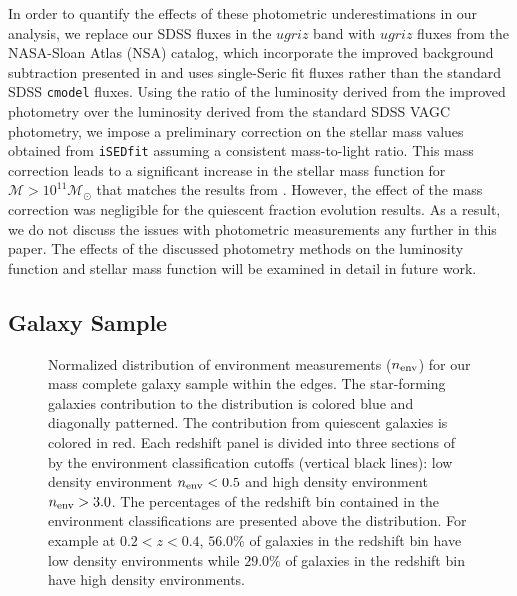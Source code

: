 \documentclass{emulateapj}
\begin{document}
In order to quantify the effects of these photometric underestimations in our analysis, we replace our SDSS fluxes in the $ugriz$ band with $ugriz$ fluxes from the NASA-Sloan Atlas (NSA) catalog, which incorporate the improved background subtraction presented in \cite{Blanton:2011aa} and uses single-Seric fit fluxes rather than the standard SDSS \texttt{cmodel} fluxes. Using the ratio of the luminosity derived from the improved photometry over the luminosity derived from the standard SDSS VAGC photometry, we impose a preliminary correction on the stellar mass values obtained from \texttt{iSEDfit} assuming a consistent mass-to-light ratio. This mass correction leads to a significant increase in the stellar mass function for $\mathcal{M} > 10^{11} \mathcal{M}_{\odot}$ that matches the results from \cite{Bernardi:2013aa}. However, the effect of the mass correction was negligible for the quiescent fraction evolution results. As a result, we do not discuss the issues with photometric measurements any further in this paper. The effects of the discussed photometry methods on the luminosity function and stellar mass function will be examined in detail in future work. 
\subsection{Galaxy Sample} \label{sec:target} 
\begin{figure*}
  \begin{center}
    \leavevmode
     \caption{Normalized distribution of environment measurements ($n_{\rm{env}}$) for our mass complete galaxy sample within the edges. The star-forming galaxies contribution to the distribution is colored blue and diagonally patterned. The contribution from quiescent galaxies is colored in red. Each redshift panel is divided into three sections of by the environment classification cutoffs (vertical black lines): low density environment $n_{\rm{env}} < 0.5$ and high density environment $n_{\rm{env}} > 3.0$. The percentages of the redshift bin contained in the environment classifications are presented above the distribution. For example at $0.2 < z < 0.4$, $56.0 \%$ of galaxies in the redshift bin have low density environments while $29.0\%$ of galaxies in the redshift bin have high density environments. }      \label{fig:envcount}
    \end{center}
\end{figure*}
\end{document}
